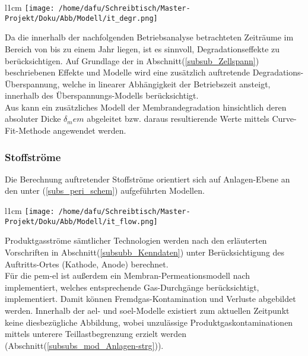 \documentclass[onecolumn,10pt,titlepage]{article}
\begin{document}
\begin{wrapfigure}{l}{1cm}
	\texttt{[image: /home/dafu/Schreibtisch/Master-Projekt/Doku/Abb/Modell/it\_degr.png]}
\end{wrapfigure} Da die innerhalb der nachfolgenden Betriebsanalyse betrachteten Zeiträume im Bereich von bis zu einem Jahr liegen, ist es sinnvoll, Degradationseffekte zu berücksichtigen. Auf Grundlage der in Abschnitt(\ref{subsub_Zellspann}) beschriebenen Effekte und Modelle wird eine zusätzlich auftretende Degradations-Überspannung, welche in linearer Abhängigkeit der Betriebszeit ansteigt, innerhalb des Überspannungs-Modells berücksichtigt.\\
Aus \cite{Chandesris2015} kann ein zusätzliches Modell der Membrandegradation hinsichtlich deren absoluter Dicke $\delta_mem $ abgeleitet bzw. daraus resultierende Werte mittels Curve-Fit-Methode angewendet werden.



\subsubsection{Stoffströme}
\label{subsubs_mod_stoffstroeme}

Die Berechnung auftretender Stoffströme orientiert sich auf Anlagen-Ebene an den unter (\ref{subs_peri_schem}) aufgeführten Modellen.
\begin{wrapfigure}{l}{1cm}
	\texttt{[image: /home/dafu/Schreibtisch/Master-Projekt/Doku/Abb/Modell/it\_flow.png]}
\end{wrapfigure} Produktgasströme sämtlicher Technologien werden nach den erläuterten Vorschriften in Abschnitt(\ref{subsubb_Kenndaten}) unter Berücksichtigung des Auftritts-Ortes (Kathode, Anode) berechnet.\\
Für die \gls{pem}-\gls{el} ist außerdem ein Membran-Permeationsmodell nach \cite{Tjarks2017} implementiert, welches entsprechende Gas-Durchgänge berücksichtigt, implementiert. Damit können Fremdgas-Kontamination und Verluste abgebildet werden. Innerhalb der \gls{ael}- und \gls{soel}-Modelle existiert zum aktuellen Zeitpunkt keine diesbezügliche Abbildung, wobei unzulässige Produktgaskontaminationen mittels unterere Teillastbegrenzung erzielt werden (Abschnitt(\ref{subsubs_mod_Anlagen-strg})).
\end{document}
